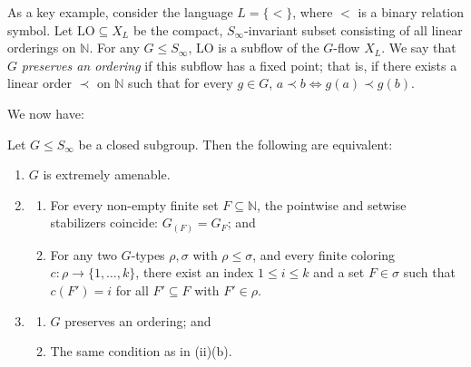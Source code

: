 As a key example, consider the language $L = \{<\}$, where $<$ is a binary relation symbol. Let $\mathrm{LO} \subseteq X_L$ be the compact, $S_\infty$-invariant subset consisting of all linear orderings on $\mathbb{N}$. For any $G \le S_\infty$, $\mathrm{LO}$ is a subflow of the $G$-flow $X_L$. We say that $G$ \textit{preserves an ordering} if this subflow has a fixed point; that is, if there exists a linear order $\prec$ on $\mathbb{N}$ such that for every $g \in G$, $a \prec b \Leftrightarrow g(a) \prec g(b)$.


We now have:


\begin{proposition}
    \label{prop:stabilizer_ramsey_equiv}
    Let $G \le S_\infty$ be a closed subgroup. Then the following are equivalent:
    \begin{enumerate}
        \item[(i)] $G$ is extremely amenable.
        \item[(ii)]
              \begin{enumerate}
                  \item[\textbf{(a)}] For every non-empty finite set $F \subseteq \mathbb{N}$, the pointwise and setwise stabilizers coincide: $G_{(F)} = G_F$; and
                  \item[\textbf{(b)}] For any two $G$-types $\rho, \sigma$ with $\rho \le \sigma$, and every finite coloring $c: \rho \to \{1, \dots, k\}$, there exist an index $1 \le i \le k$ and a set $F \in \sigma$ such that $c(F') = i$ for all $F' \subseteq F$ with $F' \in \rho$.
              \end{enumerate}
        \item[(iii)]
              \begin{enumerate}
                  \item[\textbf{(a)'}] $G$ preserves an ordering; and
                  \item[\textbf{(b)}] The same condition as in (ii)(b).
              \end{enumerate}
    \end{enumerate}
\end{proposition}


